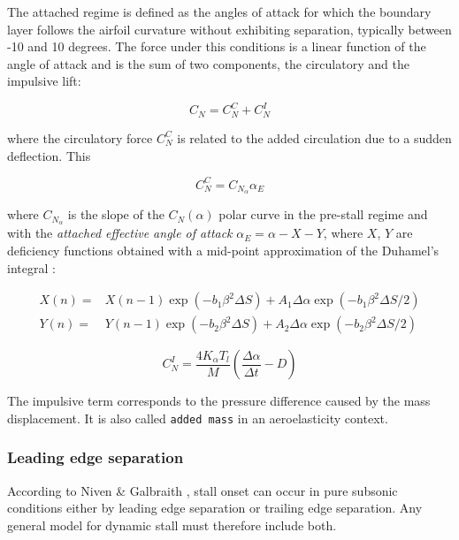 The attached regime is defined as the angles of attack for which the boundary layer follows the airfoil curvature without exhibiting separation, typically between -10 and 10 degrees. The force under this conditions is a linear function of the angle of attack and is the sum of two components, the circulatory and the impulsive lift: 

\begin{equation}
C_N = C_N^C + C_N^I
\end{equation}

\noindent where the circulatory force $C_N^C$ is related to the added circulation due to a sudden deflection. This 

\begin{equation}
C_N^C = C_{N_\alpha} \alpha_{E}
\label{eq:circulatory}
\end{equation}

\noindent where $C_{N_\alpha}$ is the slope of the $C_N(\alpha)$ polar curve in the pre-stall regime and with the \textit{attached effective angle of attack} $\alpha_E = \alpha - X - Y$, where $X$, $Y$ are deficiency functions obtained with a mid-point approximation of the Duhamel's integral \cite{leishman_principles_2006}:

\begin{eqnarray}
X(n)= & X(n-1) \exp \left(-b_{1} \beta^{2} \Delta S\right)+A_{1} \Delta \alpha \exp \left(-b_{1} \beta^{2} \Delta S / 2\right) \\
Y(n)= & Y(n-1) \exp \left(-b_{2} \beta^{2} \Delta S\right)+A_{2} \Delta \alpha \exp \left(-b_{2} \beta^{2} \Delta S / 2\right)
\end{eqnarray}

\begin{equation}
C_{N}^{I}=\frac{4 K_{\alpha} T_{l}}{M}\left(\frac{\Delta \alpha}{\Delta t}-D\right)
\label{eq:impulsive}
\end{equation}

 The impulsive term corresponds to the pressure difference caused by the mass displacement. It is also called \texttt{added mass} in an aeroelasticity context.

\subsubsection{Leading edge separation}

According to Niven \& Galbraith \cite{niven_modelling_1997}, stall onset can occur in pure subsonic conditions either by leading edge separation or trailing edge separation. Any general model for dynamic stall must therefore include both. 

